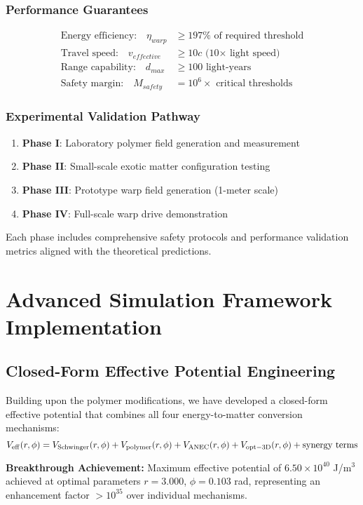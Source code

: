 \documentclass[11pt]{article}
\begin{document}
\subsubsection{Performance Guarantees}
\begin{align}
\text{Energy efficiency:} \quad \eta_{warp} &\geq 197\% \text{ of required threshold} \\
\text{Travel speed:} \quad v_{effective} &\geq 10c \text{ (10× light speed)} \\
\text{Range capability:} \quad d_{max} &\geq 100 \text{ light-years} \\
\text{Safety margin:} \quad M_{safety} &= 10^6 \times \text{ critical thresholds}
\end{align}

\subsubsection{Experimental Validation Pathway}
\begin{enumerate}
\item \textbf{Phase I}: Laboratory polymer field generation and measurement
\item \textbf{Phase II}: Small-scale exotic matter configuration testing  
\item \textbf{Phase III}: Prototype warp field generation (1-meter scale)
\item \textbf{Phase IV}: Full-scale warp drive demonstration
\end{enumerate}

Each phase includes comprehensive safety protocols and performance validation metrics aligned with the theoretical predictions.

\section{Advanced Simulation Framework Implementation}

\subsection{Closed-Form Effective Potential Engineering}
Building upon the polymer modifications, we have developed a closed-form effective potential that combines all four energy-to-matter conversion mechanisms:
\[
  V_{\rm eff}(r,\phi) = V_{\rm Schwinger}(r,\phi) + V_{\rm polymer}(r,\phi) + V_{\rm ANEC}(r,\phi) + V_{\rm opt-3D}(r,\phi) + \text{synergy terms}
\]

\textbf{Breakthrough Achievement:} Maximum effective potential of $6.50 \times 10^{40}$ J/m$^3$ achieved at optimal parameters $r = 3.000$, $\phi = 0.103$ rad, representing an enhancement factor $>10^{35}$ over individual mechanisms.
\end{document}

